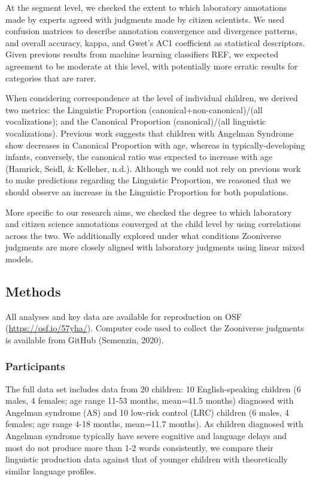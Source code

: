 \documentclass[english,,man,floatsintext]{apa6}
\begin{document}
At the segment level, we checked the extent to which laboratory annotations made by experts agreed with judgments made by citizen scientists. We used confusion matrices to describe annotation convergence and divergence patterns, and overall accuracy, kappa, and Gwet's AC1 coefficient as statistical descriptors. Given previous results from machine learning classifiers REF, we expected agreement to be moderate at this level, with potentially more erratic results for categories that are rarer.

When considering correspondence at the level of individual children, we derived two metrics: the Linguistic Proportion (canonical+non-canonical)/(all vocalizations); and the Canonical Proportion (canonical)/(all linguistic vocalizations). Previous work suggests that children with Angelman Syndrome show decreases in Canonical Proportion with age, whereas in typically-developing infants, conversely, the canonical ratio was expected to increase with age (Hamrick, Seidl, \& Kelleher, n.d.). Although we could not rely on previous work to make predictions regarding the Linguistic Proportion, we reasoned that we should observe an increase in the Linguistic Proportion for both populations.

More specific to our research aims, we checked the degree to which laboratory and citizen science annotations converged at the child level by using correlations across the two. We additionally explored under what conditions Zooniverse judgments are more closely aligned with laboratory judgments using linear mixed models.

\hypertarget{methods}{%
\subsection{Methods}\label{methods}}

All analyses and key data are available for reproduction on OSF (\url{https://osf.io/57yha/}). Computer code used to collect the Zooniverse judgments is available from GitHub (Semenzin, 2020).

\hypertarget{participants}{%
\subsubsection{Participants}\label{participants}}

The full data set includes data from 20 children: 10 English-speaking children (6 males, 4 females; age range 11-53 months, mean=41.5 months) diagnosed with Angelman syndrome (AS) and 10 low-risk control (LRC) children (6 males, 4 females; age range 4-18 months, mean=11.7 months). As children diagnosed with Angelman syndrome typically have severe cognitive and language delays and most do not produce more than 1-2 words consistently, we compare their linguistic production data against that of younger children with theoretically similar language profiles.
\end{document}
